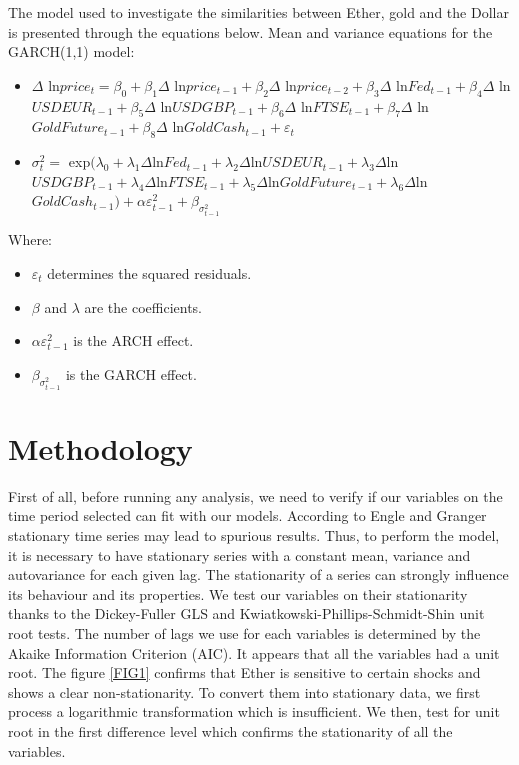 \documentclass[11pt]{report}
\begin{document}
The model used to investigate the similarities between Ether, gold and the Dollar is presented through the equations below. \newline
Mean and variance equations for the GARCH(1,1) model: \newline \begin{itemize}
\item $\Delta$ ln$price_t = \beta_0 + \beta_1\Delta$ ln$price_{t-1} + \beta_2 \Delta$ ln$price_{t-2} + \beta_3 \Delta$ ln$Fed_{t-1} + \beta_4 \Delta$ ln$USDEUR_{t-1} + \beta_5 \Delta$ ln$USDGBP_{t-1} + \beta_6 \Delta$ ln$FTSE_{t-1} + \beta_7 \Delta$ ln$GoldFuture_{t-1} + \beta_8 \Delta$ ln$GoldCash_{t-1} + \varepsilon_t$	
\newline
\item $\sigma_t^2 =$ exp$(\lambda_0 + \lambda_1 \Delta$ln$Fed_{t-1} + \lambda_2 \Delta$ln$USDEUR_{t-1} + \lambda_3 \Delta$ln$USDGBP_{t-1} + \lambda_4 \Delta$ln$FTSE_{t-1} + \lambda_5 \Delta$ln$GoldFuture_{t-1} + \lambda_6 \Delta$ln$GoldCash_{t-1})+ \alpha \varepsilon_{t-1}^2 + \beta_{\sigma_{t-1}^2}$
\end{itemize}\bigbreak
Where:\begin{itemize}
\item $\varepsilon_t$ determines the squared residuals.
\item $\beta$ and $\lambda$ are the coefficients.
\item $\alpha\varepsilon_{t-1}^2$ is the ARCH effect.
\item $\beta_{\sigma_{t-1}^2}$ is the GARCH effect.
\end{itemize}
\clearpage	
	\section{Methodology}

First of all, before running any analysis, we need to verify if our variables on the time period selected can fit with our models. According to Engle and Granger \cite{DING} stationary time series may lead to spurious results. Thus, to perform the model, it is necessary to have stationary series with a constant mean, variance and autovariance for each given lag. The stationarity of a series can strongly influence its behaviour and its properties. We test our variables on their stationarity thanks to the Dickey-Fuller GLS and Kwiatkowski-Phillips-Schmidt-Shin unit root tests. The number of lags we use for each variables is determined by the Akaike Information Criterion (AIC). It appears that all the variables had a unit root. The figure \ref{FIG1} confirms that Ether is sensitive to certain shocks and shows a clear non-stationarity.  To convert them into stationary data, we first process a logarithmic transformation which is insufficient.  We then, test for unit root in the first difference level which confirms the stationarity of all the variables.  \smallbreak
\end{document}
